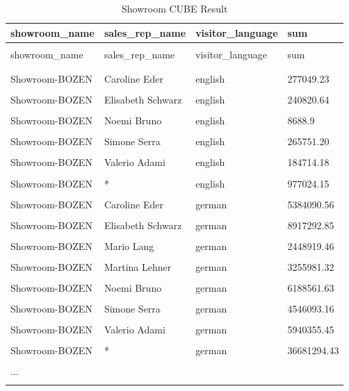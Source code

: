\documentclass[letterpaper,12pt]{article}
\begin{document}
\begingroup
\renewcommand\arraystretch{0.5}
\begin{longtable}{p{4cm}p{4cm}p{3cm}p{3cm}}
        \caption{Showroom CUBE Result} \\
	showroom\_name & sales\_rep\_name & visitor\_language & sum \\
        \endfirsthead \\
        showroom\_name & sales\_rep\_name & visitor\_language & sum \\
        \endhead \\
        \hline \\
        Showroom-BOZEN & Caroline Eder & english & 277049.23 \\
        \hline \\
        Showroom-BOZEN & Elisabeth Schwarz & english & 240820.64 \\
        \hline \\
        Showroom-BOZEN & Noemi Bruno & english & 8688.9 \\
        \hline \\
        Showroom-BOZEN & Simone Serra & english & 265751.20 \\
        \hline \\
        Showroom-BOZEN & Valerio Adami & english & 184714.18 \\
        \hline \\
        Showroom-BOZEN & * & english & 977024.15 \\
        \hline \\
        Showroom-BOZEN & Caroline Eder & german & 5384090.56 \\
        \hline \\
        Showroom-BOZEN & Elisabeth Schwarz & german & 8917292.85 \\
        \hline \\
        Showroom-BOZEN & Mario Lang & german & 2448919.46 \\
        \hline \\
        Showroom-BOZEN & Martina Lehner & german & 3255981.32 \\
        \hline \\
        Showroom-BOZEN & Noemi Bruno & german & 6188561.63 \\
        \hline \\
        Showroom-BOZEN & Simone Serra & german & 4546093.16 \\
        \hline \\
        Showroom-BOZEN & Valerio Adami & german & 5940355.45 \\
        \hline \\
        Showroom-BOZEN & * & german & 36681294.43 \\
        \hline \\
        ... \\
        \hline \\
\end{longtable} 
\endgroup           
\end{document}
